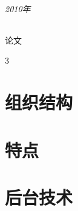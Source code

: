 \documentclass[UTF8]{ctexrep}
\begin{document}
\paragraph{2010年}
\subparagraph{论文\cite{tang2010combination}}


3~\cite{tang2011unified}
~\cite{wang2011adana}
~\cite{zhang2018name}


\part{组织结构}

\part{特点}
\part{后台技术}


\end{document}
